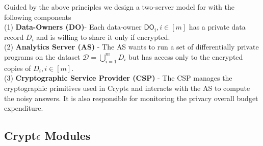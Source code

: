 Guided by the above principles we design a two-server model for \system with the following components
\\(1)\textbf{ Data-Owners (\textsf{DO})}-  Each data-owner $\textsf{DO}_i, i \in [m]$ has  a
private data record $D_i$ and is willing to share it only if encrypted.   \\(2)\textbf{ Analytics Server (\textsf{AS})} - The \textsf{AS} wants to run a set of differentially private programs on the dataset $\mathcal{D}=\bigcup_{i=1}^m D_i$  but has 
access only to the encrypted copies of $D_i, i \in [m]$.
\\(3)\textbf{ Cryptographic Service Provider (\textsf{CSP})} -
 The \textsf{CSP} manages the cryptographic primitives used in Crypt$\epsilon$ and interacts with the \textsf{AS} to compute the
noisy answers. It is also responsible for monitoring the privacy overall budget expenditure.

 
 
\subsection{Crypt$\epsilon$ Modules}

